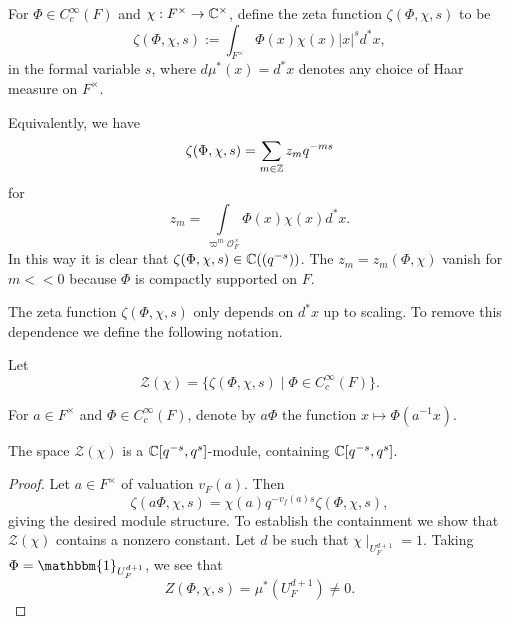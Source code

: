 \begin{defn}
    For $\Phi \in C_c^\infty(F)$ and $\chi :F^\times \to \mathbb{C}^\times$, define the zeta function $\zeta(\Phi,\chi,s)$ to be
    $$\zeta(\Phi,\chi,s) := \int_{F^\times} \Phi(x)\chi(x)|x|^s d^*x,$$ in the formal variable $s$, where $d\mu^*(x) = d^*x$ denotes any choice of Haar measure on $F^\times$.
\end{defn}

Equivalently, we have
$$\zeta(\Phi,\chi,s) = \sum\limits_{m \in \mathbb{Z}} z_m q^{-ms}$$
for $$z_m = \int\limits_{\varpi^m \mathcal O_F^\times} \Phi(x)\chi(x)d^*x.$$ In this way it is clear that $\zeta(\Phi,\chi,s) \in \mathbb{C}((q^{-s}))$. The $z_m=z_m(\Phi,\chi)$ vanish for $m <<0$ because $\Phi$ is compactly supported on $F$.

The zeta function $\zeta(\Phi,\chi,s)$ only depends on $d^*x$ up to scaling. To remove this dependence we define the following notation.

\begin{notn}
    Let $$\mathcal Z(\chi) = \{\zeta(\Phi,\chi,s) \mid \Phi \in C_c^\infty(F)\}.$$
\end{notn}

\begin{notn}
    For $a \in F^\times$ and $\Phi \in C_c^\infty(F)$, denote by $a\Phi$ the function $x \mapsto \Phi(a^{-1}x)$.
\end{notn}

\begin{lemma}
    The space $\mathcal Z(\chi)$ is a $\mathbb{C}[q^{-s},q^s]$-module, containing $\mathbb{C}[q^{-s},q^s]$.
\end{lemma}
\begin{proof}
    Let $a \in F^\times$ of valuation $v_F(a)$. Then 
    $$\zeta(a\Phi,\chi,s) = \chi(a)q^{-v_f(a)s}\zeta(\Phi,\chi,s),$$ giving the desired module structure. To establish the containment we show that $\mathcal Z(\chi)$ contains a nonzero constant. Let $d$ be such that $\chi \mid_{U_F^{d+1}} = 1$. Taking $\Phi=\mathbbm{1}_{U_F^{d+1}}$, we see that 
    $$Z(\Phi,\chi,s) = \mu^*(U_F^{d+1}) \neq 0.$$
\end{proof}

